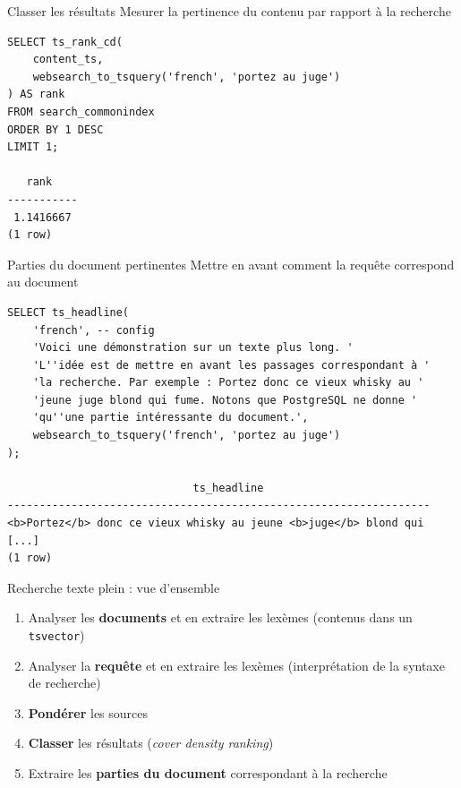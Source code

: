 \documentclass{beamer}
\begin{document}
\begin{frame}[fragile]{Classer les résultats}
    Mesurer la pertinence du contenu par rapport à la recherche
    \begin{verbatim}
SELECT ts_rank_cd(
    content_ts,
    websearch_to_tsquery('french', 'portez au juge')
) AS rank
FROM search_commonindex
ORDER BY 1 DESC
LIMIT 1;

   rank
-----------
 1.1416667
(1 row)
    \end{verbatim}
\end{frame}

\begin{frame}[fragile]{Parties du document pertinentes}
Mettre en avant comment la requête correspond au document
    \begin{verbatim}
SELECT ts_headline(
    'french', -- config
    'Voici une démonstration sur un texte plus long. '
    'L''idée est de mettre en avant les passages correspondant à '
    'la recherche. Par exemple : Portez donc ce vieux whisky au '
    'jeune juge blond qui fume. Notons que PostgreSQL ne donne '
    'qu''une partie intéressante du document.',
    websearch_to_tsquery('french', 'portez au juge')
);

                             ts_headline
------------------------------------------------------------------
<b>Portez</b> donc ce vieux whisky au jeune <b>juge</b> blond qui [...]
(1 row)
    \end{verbatim}
\end{frame}

\begin{frame}{Recherche texte plein : vue d'ensemble}
    \begin{enumerate}
        \item Analyser les \textbf{documents} et en extraire les lexèmes\newline
            (contenus dans un \texttt{tsvector})
        \item Analyser la \textbf{requête} et en extraire les lexèmes\newline
            (interprétation de la syntaxe de recherche)
        \item \textbf{Pondérer} les sources
        \item \textbf{Classer} les résultats (\textit{cover density ranking})
        \item Extraire les \textbf{parties du document} correspondant à la recherche
    \end{enumerate}
\end{frame}
\end{document}
